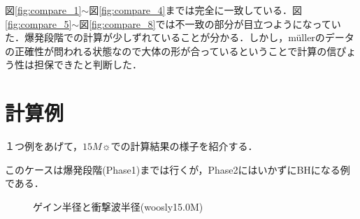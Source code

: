 \newpage

図\ref{fig:compare_1}$\sim$図\ref{fig:compare_4}までは完全に一致している．図\ref{fig:compare_5}$\sim$図\ref{fig:compare_8}では不一致の部分が目立つようになっていた．爆発段階での計算が少しずれていることが分かる．しかし，m\"{u}llerのデータの正確性が問われる状態なので大体の形が合っているということで計算の信ぴょう性は担保できたと判断した．

\section{計算例}

１つ例をあげて，$15M\sun$での計算結果の様子を紹介する．

このケースは爆発段階(Phase1)までは行くが，Phase2にはいかずにBHになる例である．

\begin{figure}[htbp]
  \begin{center}
  \end{center}
  \caption{ゲイン半径と衝撃波半径(woosly15.0M)}
  \label{fig:example_r_t}
\end{figure}

